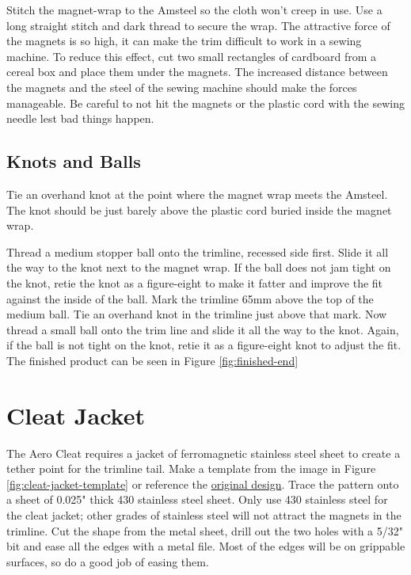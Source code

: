 \documentclass[
]{book}
\begin{document}
Stitch the magnet-wrap to the Amsteel so the cloth won't creep in use. Use a long straight stitch and dark thread to secure the wrap. The attractive force of the magnets is so high, it can make the trim difficult to work in a sewing machine. To reduce this effect, cut two small rectangles of cardboard from a cereal box and place them under the magnets. The increased distance between the magnets and the steel of the sewing machine should make the forces manageable. Be careful to not hit the magnets or the plastic cord with the sewing needle lest bad things happen.

\hypertarget{knots-and-balls}{%
\subsection{Knots and Balls}\label{knots-and-balls}}

Tie an overhand knot at the point where the magnet wrap meets the Amsteel. The knot should be just barely above the plastic cord buried inside the magnet wrap.

Thread a medium stopper ball onto the trimline, recessed side first. Slide it all the way to the knot next to the magnet wrap. If the ball does not jam tight on the knot, retie the knot as a figure-eight to make it fatter and improve the fit against the inside of the ball. Mark the trimline 65mm above the top of the medium ball. Tie an overhand knot in the trimline just above that mark. Now thread a small ball onto the trim line and slide it all the way to the knot. Again, if the ball is not tight on the knot, retie it as a figure-eight knot to adjust the fit. The finished product can be seen in Figure \ref{fig:finished-end}

\hypertarget{cleat-jacket}{%
\section{Cleat Jacket}\label{cleat-jacket}}

The Aero Cleat requires a jacket of ferromagnetic stainless steel sheet to create a tether point for the trimline tail. Make a template from the image in Figure \ref{fig:cleat-jacket-template} or reference the \href{https://github.com/pbchase/kite_bar_parts/blob/master/cleat_jacket_template.svg}{original design}. Trace the pattern onto a sheet of 0.025" thick 430 stainless steel sheet. Only use 430 stainless steel for the cleat jacket; other grades of stainless steel will not attract the magnets in the trimline. Cut the shape from the metal sheet, drill out the two holes with a 5/32" bit and ease all the edges with a metal file. Most of the edges will be on grippable surfaces, so do a good job of easing them.
\end{document}
